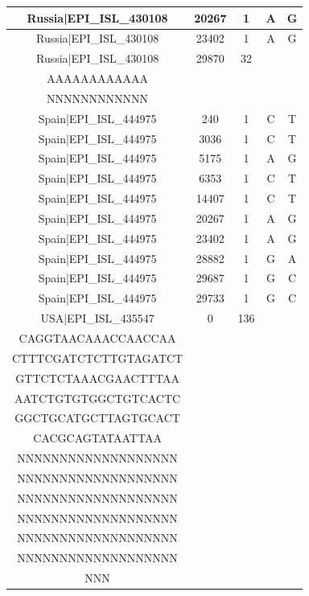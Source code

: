 \documentclass[a4paper,10pt]{article}
\begin{document}
\begin{longtable}{@{}ccccc@{}}
Russia|EPI\_ISL\_430108 & 20267 & 1 & A & G \\* \midrule
Russia|EPI\_ISL\_430108 & 23402 & 1 & A & G \\* \midrule
Russia|EPI\_ISL\_430108 & 29870 & 32 & \begin{tabular}[c]{@{}c@{}}AAAAAAAAAAAAAAAAAAAA\\ AAAAAAAAAAAA\end{tabular} & \begin{tabular}[c]{@{}c@{}}NNNNNNNNNNNNNNNNNNNN\\ NNNNNNNNNNNN\end{tabular} \\* \midrule
Spain|EPI\_ISL\_444975 & 240 & 1 & C & T \\* \midrule
Spain|EPI\_ISL\_444975 & 3036 & 1 & C & T \\* \midrule
Spain|EPI\_ISL\_444975 & 5175 & 1 & A & G \\* \midrule
Spain|EPI\_ISL\_444975 & 6353 & 1 & C & T \\* \midrule
Spain|EPI\_ISL\_444975 & 14407 & 1 & C & T \\* \midrule
Spain|EPI\_ISL\_444975 & 20267 & 1 & A & G \\* \midrule
Spain|EPI\_ISL\_444975 & 23402 & 1 & A & G \\* \midrule
Spain|EPI\_ISL\_444975 & 28882 & 1 & G & A \\* \midrule
Spain|EPI\_ISL\_444975 & 29687 & 1 & G & C \\* \midrule
Spain|EPI\_ISL\_444975 & 29733 & 1 & G & C \\* \midrule
USA|EPI\_ISL\_435547 & 0 & 136 & \begin{tabular}[c]{@{}c@{}}ATTAAAGGTTTATACCTTCC\\ CAGGTAACAAACCAACCAA\\ CTTTCGATCTCTTGTAGATCT\\ GTTCTCTAAACGAACTTTAA\\ AATCTGTGTGGCTGTCACTC\\ GGCTGCATGCTTAGTGCACT\\ CACGCAGTATAATTAA\end{tabular} & \begin{tabular}[c]{@{}c@{}}NNNNNNNNNNNNNNNNNNN\\ NNNNNNNNNNNNNNNNNNN\\ NNNNNNNNNNNNNNNNNNN\\ NNNNNNNNNNNNNNNNNNN\\ NNNNNNNNNNNNNNNNNNN\\ NNNNNNNNNNNNNNNNNNN\\ NNNNNNNNNNNNNNNNNNN\\ NNN\end{tabular} \\* \midrule

\end{longtable}
\end{document}
